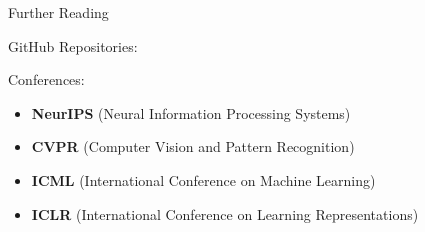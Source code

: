 \begin{frame}{Further Reading}
\begin{block}{GitHub Repositories:}
\begin{itemize}
    \end{itemize}
\end{block}
\framebreak
\begin{block}{Conferences:}
    \begin{itemize}
        \item \textbf{NeurIPS} (Neural Information Processing Systems)
        \item \textbf{CVPR} (Computer Vision and Pattern Recognition)
        \item \textbf{ICML} (International Conference on Machine Learning)
        \item \textbf{ICLR} (International Conference on Learning Representations)
    \end{itemize}
\end{block}
\end{frame}